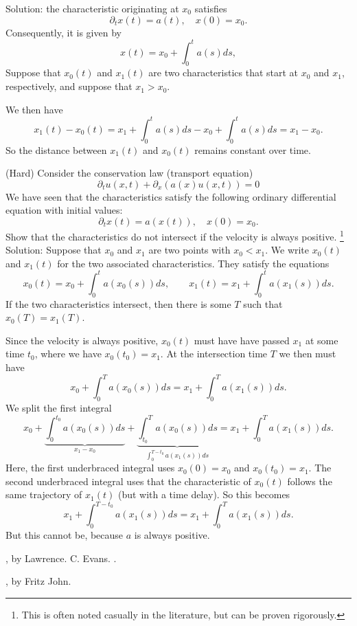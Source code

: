 \documentclass{article}
\begin{document}
\begin{exerciseList}
Solution: the characteristic originating at $x_0$ satisfies 
$$
    \partial_t x(t) = a(t), \quad x(0) = x_0.
$$
Consequently, it is given by 
$$
    x(t) = x_0 + \int_0^t a(s) ds,
$$
Suppose that $x_0(t)$ and $x_1(t)$ are two characteristics that start at $x_0$ and $x_1$, respectively, and suppose that $x_1 > x_0$.

We then have 
$$
    x_1(t) - x_0(t)
    =
    x_1 + \int_0^t a(s) ds - x_0 + \int_0^t a(s) ds
    =
    x_1 - x_0
    .
$$
So the distance between $x_1(t)$ and $x_0(t)$ remains constant over time.





\item 
(Hard) Consider the conservation law (transport equation)
$$
    \partial_t u(x,t) + \partial_x\left( a(x) u(x,t) \right) = 0
$$
We have seen that the characteristics satisfy the following ordinary differential equation with initial values:
$$
    \partial_t x(t) = a(x(t)), \quad x(0) = x_0.
$$
Show that the characteristics do not intersect if the velocity is always positive. \footnote{This is often noted casually in the literature, but can be proven rigorously.}
\\

Solution:
Suppose that $x_0$ and $x_1$ are two points with $x_0 < x_1$. 
We write $x_0(t)$ and $x_1(t)$ for the two associated characteristics. 
They satisfy the equations 
$$
    x_0(t) = x_0 + \int_0^t a( x_0(s) ) ds,
    \qquad
    x_1(t) = x_1 + \int_0^t a( x_1(s) ) ds.
$$
If the two characteristics intersect, 
then there is some $T$ such that $x_0(T) = x_1(T)$.

Since the velocity is always positive, $x_0(t)$ must have have passed $x_1$ at some time $t_0$, where we have $x_0(t_0) = x_1$.
At the intersection time $T$ we then must have 
$$
    x_0 + \int_0^T a( x_0(s) ) ds
    =
    x_1 + \int_0^T a( x_1(s) ) ds.
$$
We split the first integral
$$
    x_0
    +
    \underbrace{ \int_0^{t_0} a( x_0(s) ) ds }_{x_1 - x_0}
    +
    \underbrace{ \int_{t_0}^T a( x_0(s) ) ds }_{\int_0^{T-t_0} a( x_1(s) ) ds}
    =
    x_1
    +
    \int_0^T a( x_1(s) ) ds.
$$
Here, the first underbraced integral uses $x_0(0)=x_0$ and $x_0(t_0)=x_1$.
The second underbraced integral uses that the characteristic of $x_0(t)$ follows the same trajectory of $x_1(t)$ (but with a time delay).
So this becomes 
$$
    x_1
    +
    \int_0^{T-t_0} a( x_1(s) ) ds 
    =
    x_1
    +
    \int_0^T a( x_1(s) ) ds.
$$
But this cannot be, because $a$ is always positive. 

\end{exerciseList}


\begin{thebibliography}{99}

, by Lawrence. C. Evans.
.
 
, by Fritz John.
 
\end{thebibliography}
\end{document}
